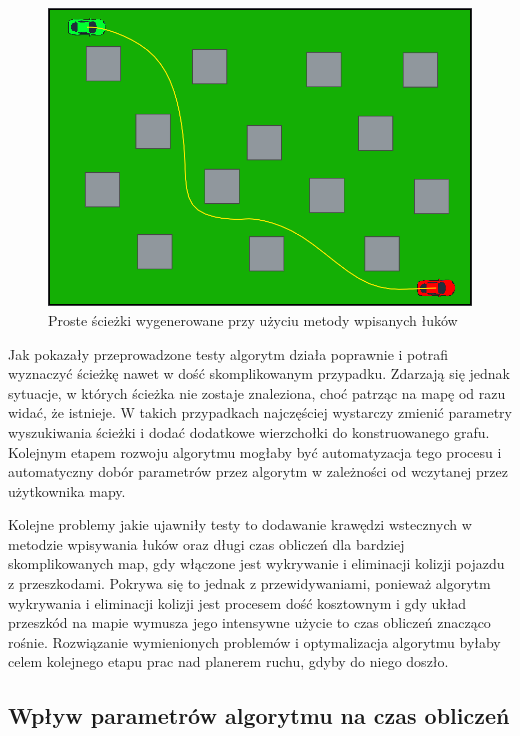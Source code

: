 \documentclass[a4paper,11pt,twoside]{report}
\theoremstyle{definition}
\begin{document}
\newpage

\begin{figure}[h!]
\centering
\includegraphics[scale=0.65]{simplePath4}
\caption[Proste ścieżki wygenerowane przy użyciu metody wpisanych łuków]{Proste ścieżki wygenerowane przy użyciu metody wpisanych łuków}
\end{figure}

Jak pokazały przeprowadzone testy algorytm działa poprawnie i potrafi wyznaczyć ścieżkę nawet w dość skomplikowanym przypadku. Zdarzają się jednak sytuacje, w których ścieżka nie zostaje znaleziona, choć patrząc na mapę od razu widać, że istnieje. W takich przypadkach najczęściej wystarczy zmienić parametry wyszukiwania ścieżki i dodać dodatkowe wierzchołki do konstruowanego grafu. Kolejnym etapem rozwoju algorytmu mogłaby być automatyzacja tego procesu i automatyczny dobór parametrów przez algorytm w zależności od wczytanej przez użytkownika mapy.

Kolejne problemy jakie ujawniły testy to dodawanie krawędzi wstecznych w metodzie wpisywania łuków oraz długi czas obliczeń dla bardziej skomplikowanych map, gdy włączone jest wykrywanie i eliminacji kolizji pojazdu z przeszkodami. Pokrywa się to jednak z przewidywaniami, ponieważ algorytm wykrywania i eliminacji kolizji jest  procesem dość kosztownym i gdy układ przeszkód na mapie wymusza jego intensywne użycie to czas obliczeń znacząco rośnie. Rozwiązanie wymienionych problemów i optymalizacja algorytmu byłaby celem kolejnego etapu prac nad planerem ruchu, gdyby do niego doszło.

\newpage

\subsection{Wpływ parametrów algorytmu na czas obliczeń}
\end{document}
